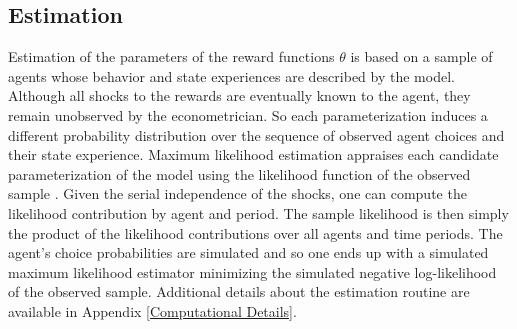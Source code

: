 \subsection{Estimation}
Estimation of the parameters of the reward functions $\theta$ is based on a sample of agents whose behavior and state experiences are described by the model. Although all shocks to the rewards are eventually known to the agent, they remain unobserved by the econometrician. So each parameterization induces a different probability distribution over the sequence of observed agent choices and their state experience. Maximum likelihood estimation appraises each candidate parameterization of the model using the likelihood function of the observed sample \citep{Fisher.1922}. Given the serial independence of the shocks, one can compute the likelihood contribution by agent and period. The sample likelihood is then simply the product of the likelihood contributions over all agents and time periods. The agent's choice probabilities are simulated and so one ends up with a simulated maximum likelihood estimator \citep{Manski.1977} minimizing the simulated negative log-likelihood of the observed sample. Additional details about the estimation routine are available in Appendix \ref{Computational Details}.
